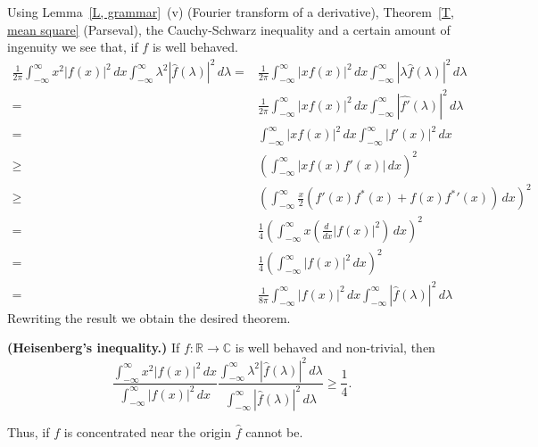 Using Lemma~\ref{L, grammar}~(v) (Fourier transform of a derivative),
Theorem~\ref{T, mean square} (Parseval), the Cauchy-Schwarz inequality
and a certain amount of ingenuity we see that, if $f$ is well behaved.
\begin{align*}
\frac{1}{2\pi}\int_{-\infty}^{\infty}x^{2}|f(x)|^{2}\,dx
\int_{-\infty}^{\infty}\lambda^{2}|\hat{f}(\lambda)|^{2}\,d\lambda
=&\frac{1}{2\pi}\int_{-\infty}^{\infty}|xf(x)|^{2}\,dx
\int_{-\infty}^{\infty}|\lambda \hat{f}(\lambda)|^{2}\,d\lambda\\
=&\frac{1}{2\pi}\int_{-\infty}^{\infty}|xf(x)|^{2}\,dx
\int_{-\infty}^{\infty}|\widehat{f'}(\lambda)|^{2}\,d\lambda\\
=&\int_{-\infty}^{\infty}|xf(x)|^{2}\,dx
\int_{-\infty}^{\infty}|f'(x)|^{2}\,dx\\
\geq&\left(\int_{-\infty}^{\infty}|xf(x)f'(x)|\,dx\right)^{2}\\
\geq&\left(\int_{-\infty}^{\infty}
\frac{x}{2}(f'(x)f^{*}(x)+f(x){f^{*}}'(x))\,dx\right)^{2}\\
=&\frac{1}{4}\left(\int_{-\infty}^{\infty}
x\left(\frac{d\ }{dx}|f(x)|^{2}\right)\,dx\right)^{2}\\
=&\frac{1}{4}\left(\int_{-\infty}^{\infty}
|f(x)|^{2}\,dx\right)^{2}\\
=&\frac{1}{8\pi}\int_{-\infty}^{\infty}|f(x)|^{2}\,dx
\int_{-\infty}^{\infty}|\hat{f}(\lambda)|^{2}\,d\lambda
\end{align*}
Rewriting the result we obtain the desired theorem.
\begin{theorem}{\bf (Heisenberg's inequality.)}
If $f:{\mathbb R}\rightarrow{\mathbb C}$
is well behaved and non-trivial, then
\[\frac{\int_{-\infty}^{\infty}x^{2}|f(x)|^{2}\,dx}
{\int_{-\infty}^{\infty}|f(x)|^{2}\,dx}
\frac{\int_{-\infty}^{\infty}\lambda^{2}|\hat{f}(\lambda)|^{2}\,d\lambda}
{\int_{-\infty}^{\infty}|\hat{f}(\lambda)|^{2}\,d\lambda}
\geq\frac{1}{4}.\]
\end{theorem}
Thus, if $f$ is concentrated near the origin $\hat{f}$
cannot be.
